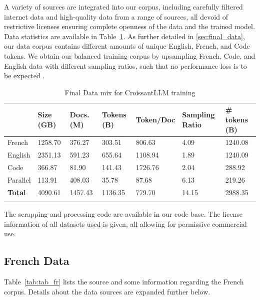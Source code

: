 A variety of sources are integrated into our corpus, including carefully filtered internet data and high-quality data from a range of sources, all devoid of restrictive licenses ensuring complete openness of the data and the trained model. Data statistics are available in Table~\ref{tab:tab_tot}. As further detailed in \ref{sec:final_data}, our data corpus contains different amounts of unique English, French, and Code tokens. We obtain our balanced training corpus by upsampling French, Code, and English data with different sampling ratios, such that no performance loss is to be expected .


\begin{table}
    \centering
    \begin{tabular}{lllllll}
    \toprule
     & Size (GB) & Docs. (M) & Tokens (B) & Token/Doc & Sampling Ratio & \# tokens (B) \\
    \midrule
        French & 1258.70 & 376.27 & 303.51 & 806.63 & 4.09 & 1240.08 \\
        English & 2351.13 & 591.23 & 655.64 & 1108.94 & 1.89 & 1240.09 \\
        Code & 366.87 & 81.90 & 141.43 & 1726.76 & 2.04 & 288.92 \\
        Parallel & 113.91 & 408.03 & 35.78 & 87.68 & 6.13 & 219.26 \\
        \midrule
        \textbf{Total} & 4090.61 & 1457.43 & 1136.35 & 779.70 & 14.15 & 2988.35 \\
    \bottomrule
    \vspace{0.2mm}
    \end{tabular}
    \caption[CroissantLLM data mix]{Final Data mix for CroissantLLM training}
    \label{tab:tab_tot}
\end{table}


The scrapping and processing code are available in our code base. The license information of all datasets used is given, all allowing for permissive commercial use.


\subsection{French Data}


Table~\ref{tab:tab_fr} lists the source and some information regarding the French corpus. Details about the data sources are expanded further below.


